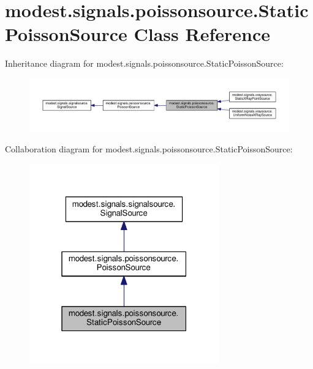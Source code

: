 \hypertarget{classmodest_1_1signals_1_1poissonsource_1_1StaticPoissonSource}{}\section{modest.\+signals.\+poissonsource.\+Static\+Poisson\+Source Class Reference}
\label{classmodest_1_1signals_1_1poissonsource_1_1StaticPoissonSource}


Inheritance diagram for modest.\+signals.\+poissonsource.\+Static\+Poisson\+Source\+:\nopagebreak
\begin{figure}[H]
\begin{center}
\leavevmode
\includegraphics[width=350pt]{classmodest_1_1signals_1_1poissonsource_1_1StaticPoissonSource__inherit__graph}
\end{center}
\end{figure}


Collaboration diagram for modest.\+signals.\+poissonsource.\+Static\+Poisson\+Source\+:\nopagebreak
\begin{figure}[H]
\begin{center}
\leavevmode
\includegraphics[width=232pt]{classmodest_1_1signals_1_1poissonsource_1_1StaticPoissonSource__coll__graph}
\end{center}
\end{figure}
